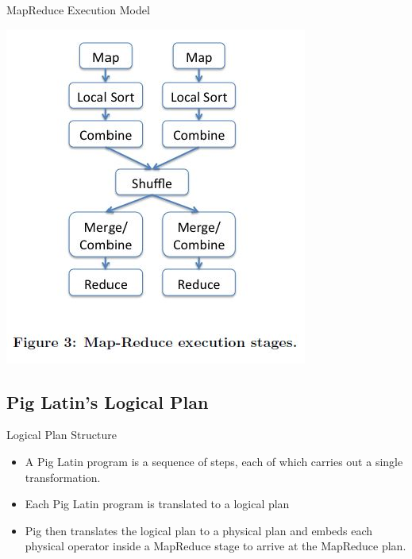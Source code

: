 \begin{frame}{MapReduce Execution Model}
\centerline{\includegraphics[scale=0.5]{Images/MapReduce_Execution.JPG}}
\let\thefootnote\relax{}
\end{frame}

\subsection{Pig Latin's Logical Plan}
\begin{frame}{Logical Plan Structure}
\begin{itemize}
	\item A Pig Latin program is a sequence of steps, each of which carries out
          a single transformation.
	\item Each Pig Latin program is translated to a logical plan
	\item Pig then translates the logical plan to a physical plan and embeds
          each physical operator inside a MapReduce stage to arrive at the
          MapReduce plan.
\end{itemize}
\end{frame}

